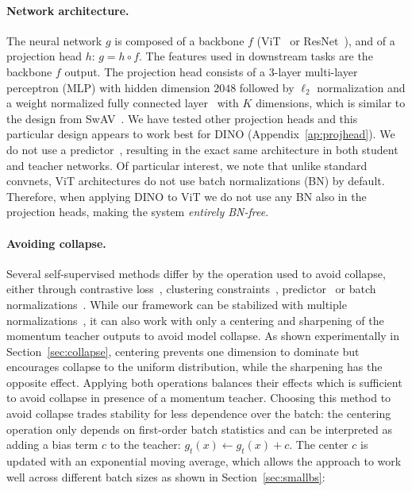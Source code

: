 \paragraph{Network architecture.} The neural network $g$ is composed of a backbone $f$ (ViT~\cite{dosovitskiy2020image} or ResNet~\cite{he2016deep}), and of a projection head $h$: $g = h \circ f$. The features used in downstream tasks are the backbone $f$ output. The projection head consists of a 3-layer multi-layer perceptron (MLP) with hidden dimension $2048$ followed by $\ell_2$ normalization and a weight normalized fully connected layer~\cite{salimans2016weight} with $K$ dimensions, which is similar to the design from SwAV~\cite{caron2020unsupervised}. We have tested other projection heads and this particular design appears to work best for DINO (Appendix~\ref{ap:projhead}).
We do not use a predictor~\cite{grill2020bootstrap, chen2020exploring}, resulting in the exact same architecture in both student and teacher networks. Of particular interest, we note that unlike standard convnets, ViT architectures do not use batch normalizations (BN) by default. Therefore, when applying DINO to ViT we do not use any BN also in the projection heads, making the system \emph{entirely BN-free}.

\paragraph{Avoiding collapse.} Several self-supervised methods differ by the operation used to avoid collapse, either through contrastive loss~\cite{wu2018unsupervised}, clustering constraints~\cite{caron2018deep,caron2020unsupervised}, predictor~\cite{grill2020bootstrap} or batch normalizations~\cite{grill2020bootstrap,richemond2020byol}. While our framework can be stabilized with multiple normalizations~\cite{caron2020unsupervised}, it can also work with only a centering and sharpening of the momentum teacher outputs to avoid model collapse. As shown experimentally in Section~\ref{sec:collapse}, centering prevents one dimension to dominate but encourages collapse to the uniform distribution, while the sharpening has the opposite effect. Applying both operations balances their effects which is sufficient to avoid collapse in presence of a momentum teacher. Choosing this method to avoid collapse trades stability for less dependence over the batch: the centering operation only depends on first-order batch statistics and can be interpreted as adding a bias term $c$ to the teacher: $g_{t}(x) \leftarrow g_{t}(x) + c$. The center $c$ is updated with an exponential moving average, which allows the approach to work well across different batch sizes as shown in Section~\ref{sec:smallbs}:

